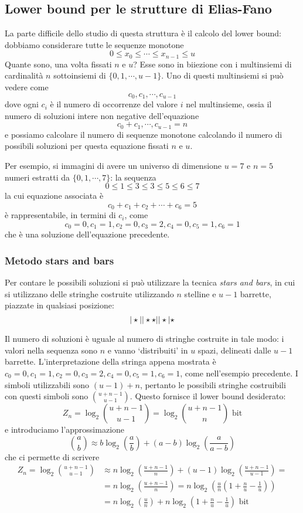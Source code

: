 \subsection{Lower bound per le strutture di Elias-Fano}
La parte difficile dello studio di questa struttura è il calcolo del lower bound:
dobbiamo considerare tutte le sequenze monotone
$$
	0 \leq x_0 \leq \cdots \leq x_{n-1} \le u
$$
Quante sono, una volta fissati $n$ e $u$? Esse sono in biiezione con i multinsiemi di cardinalità
$n$ sottoinsiemi di $\{0,1, \cdots, u-1\}$. Uno di questi multinsiemi si può vedere come
$$
	c_0, c_1, \cdots, c_{u-1}
$$
dove ogni $c_i$ è il numero di occorrenze del valore $i$ nel multinsieme, ossia
il numero di soluzioni intere non negative dell'equazione
$$
	c_0 + c_1, \cdots, c_{u-1} = n
$$
e possiamo calcolare il numero di sequenze monotone calcolando il numero
di possibili soluzioni per questa equazione fissati $n$ e $u$.

Per esempio, si immagini di avere un universo di dimensione $u = 7$ e $n = 5$ numeri
estratti da $\{0, 1, \cdots, 7\}$: la sequenza
$$
	0 \leq 1 \leq 3 \leq 3 \leq 5 \leq 6 \le 7
$$
la cui equazione associata è
$$
	c_0 + c_1 + c_2 + \cdots + c_6 = 5
$$
è rappresentabile, in termini di $c_i$, come
$$
	c_0 = 0, c_1 = 1, c_2 = 0, c_3 = 2, c_4 = 0, c_5 = 1, c_6 = 1
$$
che è una soluzione dell'equazione precedente.

\subsubsection{Metodo stars and bars}
Per contare le possibili soluzioni si può utilizzare la tecnica \textit{stars and bars}, in
cui si utilizzano delle stringhe costruite utilizzando $n$ stelline e $u-1$ barrette, piazzate
in qualsiasi posizione:
$$
	| \starsymb || \starsymb \starsymb || \starsymb | \starsymb
$$

Il numero di soluzioni è uguale al numero di stringhe costruite in tale modo: i valori nella sequenza
sono $n$ e vanno `distribuiti' in $u$ spazi, delineati dalle $u-1$ barrette. L'interpretazione della
stringa appena mostrata è $ c_0 = 0, c_1 = 1, c_2 = 0, c_3 = 2, c_4 = 0, c_5 = 1, c_6 = 1 $, come
nell'esempio precedente. I simboli utilizzabili sono $(u-1) + n$, pertanto le possibili stringhe
costruibili con questi simboli sono  ${u + n -1}\choose{u - 1}$.
Questo fornisce il lower bound desiderato:
$$
	Z_n = \log_2{{u + n -1}\choose{u - 1}} = \log_2{{u + n - 1}\choose{n}} \text{ bit}
$$
e introduciamo l'approssimazione
$$
	{{a}\choose{b}} \approx b \log_2(\frac{a}{b}) + (a - b)\log_2(\frac{a}{a-b})
$$
che ci permette di scrivere
\begin{align*}
	Z_n = \log_2{{u + n -1}\choose{u - 1}} & \approx n \log_2(\frac{u + n -1}{n}) + (u -1) \log_2(\frac{u + n - 1}{u - 1}) =        \\
	                                       & = n \log_2(\frac{u + n - 1}{n}) = n \log_2(\frac{u}{n}(1 + \frac{n}{u} - \frac{1}{u})) \\
	                                       & = n \log_2(\frac{u}{n}) + n \log_2(1 + \frac{n}{u} - \frac{1}{u}) \text{ bit}
\end{align*}

